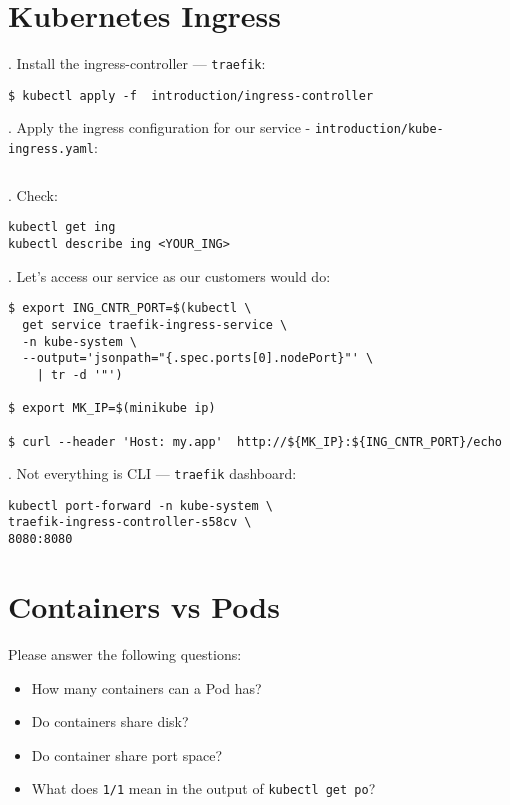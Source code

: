 \documentclass[12pt, letterpaper]{article}
\begin{document}
%
%
%
\pagebreak
\section{Kubernetes Ingress}

. Install the ingress-controller --- \verb|traefik|:

\begin{verbatim}
$ kubectl apply -f  introduction/ingress-controller
\end{verbatim}

. Apply the ingress configuration for our service - \verb|introduction/kube-ingress.yaml|:
\inputminted{yaml}{introduction/kube-ingress.yaml}

. Check:

\begin{verbatim}
kubectl get ing
kubectl describe ing <YOUR_ING>
\end{verbatim}

. Let's access our service as our customers would do:

\begin{verbatim}
$ export ING_CNTR_PORT=$(kubectl \
  get service traefik-ingress-service \
  -n kube-system \
  --output='jsonpath="{.spec.ports[0].nodePort}"' \
    | tr -d '"')

$ export MK_IP=$(minikube ip)

$ curl --header 'Host: my.app'  http://${MK_IP}:${ING_CNTR_PORT}/echo

\end{verbatim}

. Not everything is CLI --- \verb|traefik| dashboard:

\begin{verbatim}
kubectl port-forward -n kube-system \
traefik-ingress-controller-s58cv \
8080:8080
\end{verbatim}

\section{Containers vs Pods}
Please answer the following questions:
\begin{itemize}
\item How many containers can a Pod has?
\item Do containers share disk?
\item Do container share port space?
\item What does \verb|1/1| mean in the output of \verb|kubectl get po|?
\end{itemize}
\end{document}
